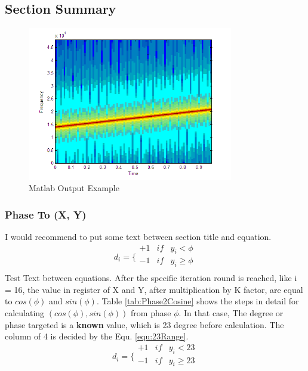 \subsection{Section Summary}

\begin{figure}[!hbpt]
\begin{center}
\includegraphics[width=0.8\textwidth]{graphic/AfterDigitalized.png}
\caption{Matlab Output Example}
\label{fig:MatlabChirp}
\end{center}
\end{figure}

\subsubsection{Phase To (X, Y)}
I would recommend to put some text between section title and equation.
\begin{equation}
d_{i} = \Bigg\{ 
\begin{array}{ccc}
+1 & if &  y_i <  \phi      	\\
-1 & if &  y_i \ge \phi       \\
\end{array}
\label{equ:phiRange}
\end{equation}
Test Text between equations. After the specific iteration round is reached, like i = 16, the value in register of X and Y, after multiplication by K factor, are equal to $cos(\phi)$ and $sin(\phi)$. Table \ref{tab:Phase2Cosine} shows the steps in detail for calculating $(cos(\phi) ,sin(\phi))$ from phase $\phi$. In that case, The degree or phase targeted is a \textbf{known} value, which is 23 degree before calculation. The column of 4 is decided by the Equ. \eqref{equ:23Range}.
\begin{equation}
d_{i} = \Bigg\{ 
\begin{array}{ccc}
+1 & if &  y_i <  23      	\\
-1 & if &  y_i \ge 23       \\
\end{array}
\label{equ:23Range}
\end{equation}

